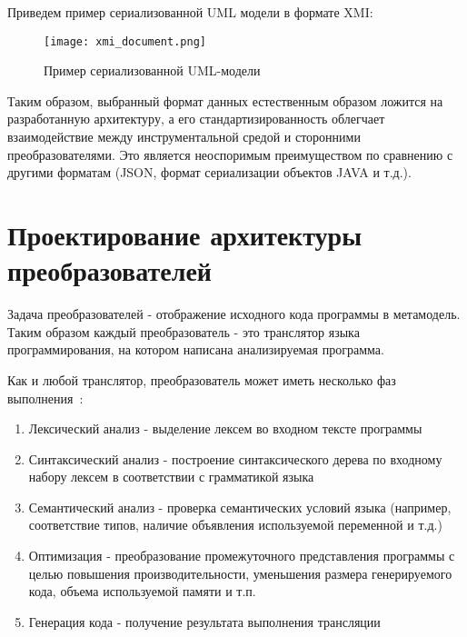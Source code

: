 Приведем пример сериализованной UML модели в формате XMI:

\begin{figure}[ht]
    \begin{center}
        \texttt{[image: xmi\_document.png]}
    \end{center}
    \caption{Пример сериализованной UML-модели}
    \label{fig:xmi_document}
\end{figure}

Таким образом, выбранный формат данных естественным образом ложится на
разработанную архитектуру, а его стандартизированность облегчает взаимодействие
между инструментальной средой и сторонними преобразователями. Это является
неоспоримым преимуществом по сравнению с другими форматам (JSON, формат
сериализации объектов JAVA и т.д.).

\section{Проектирование архитектуры преобразователей}
\label{sec:transformer_architerture}

Задача преобразователей - отображение исходного кода программы в метамодель.
Таким образом каждый преобразователь - это транслятор языка программирования, на
котором написана анализируемая программа.

Как и любой транслятор, преобразователь может иметь несколько фаз
выполнения~\cite{Aho1986}:

\begin{enumerate}
    \item Лексический анализ - выделение лексем во входном тексте программы
    \item Синтаксический анализ - построение синтаксического дерева по входному
    набору лексем в соответствии с грамматикой языка
    \item Семантический анализ - проверка семантических условий языка (например,
    соответствие типов, наличие объявления используемой переменной и т.д.)
    \item Оптимизация - преобразование промежуточного представления программы
    с целью повышения производительности, уменьшения размера генерируемого кода,
    объема используемой памяти и т.п.
    \item Генерация кода - получение результата выполнения трансляции
\end{enumerate}

